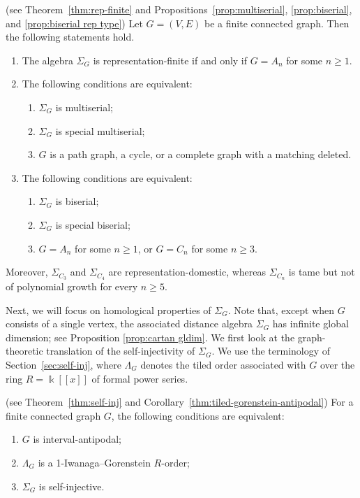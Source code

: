 \documentclass[a4paper,leqno]{amsart}
\begin{document}
\begin{thm}\textnormal{(see Theorem~\ref{thm:rep-finite} and
Propositions~\ref{prop:multiserial}, \ref{prop:biserial}, and
\ref{prop:biserial rep type})}
Let $G=(V,E)$ be a finite connected graph.  Then the following statements
hold.
\begin{enumerate}
    \item The algebra $\Sigma_G$ is representation-finite if and only if $G=A_n$ for some $n\geq1$.

    \item The following conditions are equivalent:
    \begin{enumerate}
        \item $\Sigma_G$ is multiserial;
        \item $\Sigma_G$ is special multiserial;
        \item $G$ is a path graph, a cycle, or a complete graph with a
        matching deleted.
    \end{enumerate}

    \item The following conditions are equivalent:
    \begin{enumerate}
        \item $\Sigma_G$ is biserial;
        \item $\Sigma_G$ is special biserial;
        \item $G=A_n$ for some $n\geq1$, or $G=C_n$ for some $n\geq3$.
    \end{enumerate}
\end{enumerate}
Moreover, $\Sigma_{C_3}$ and $\Sigma_{C_4}$ are representation-domestic, whereas $\Sigma_{C_n}$ is tame but not of polynomial growth for every $n\geq5$.
\end{thm}

Next, we will focus on homological properties of $\Sigma_G$.
Note that, except when $G$ consists of a single vertex, the associated distance algebra $\Sigma_G$ has infinite global dimension; see Proposition \ref{prop:cartan gldim}.
We first look at the graph-theoretic translation of the self-injectivity of $\Sigma_G$.  
We use the terminology of Section~\ref{sec:self-inj}, where $\Lambda_G$ denotes the tiled order associated with $G$ over the ring $R=\Bbbk[[x]]$ of formal power series.

\begin{thm}\textnormal{(see Theorem~\ref{thm:self-inj} and
Corollary~\ref{thm:tiled-gorenstein-antipodal})}
For a finite connected graph $G$, the following conditions are
equivalent:
\begin{enumerate}
    \item $G$ is interval-antipodal;
    \item $\Lambda_G$ is a 1-Iwanaga--Gorenstein $R$-order;
    \item $\Sigma_G$ is self-injective.
\end{enumerate}
\end{thm}
\end{document}
